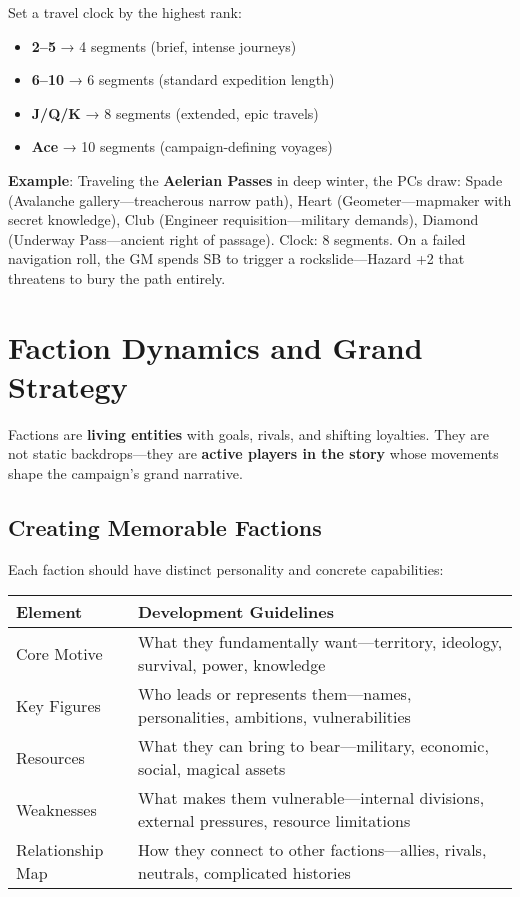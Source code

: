 Set a travel clock by the highest rank:
\begin{itemize}
    \item \textbf{2--5} → 4 segments (brief, intense journeys)
    \item \textbf{6--10} → 6 segments (standard expedition length)
    \item \textbf{J/Q/K} → 8 segments (extended, epic travels)
    \item \textbf{Ace} → 10 segments (campaign-defining voyages)
\end{itemize}

\textbf{Example}: Traveling the \textbf{Aelerian Passes} in deep winter, the PCs draw: Spade (Avalanche gallery—treacherous narrow path), Heart (Geometer—mapmaker with secret knowledge), Club (Engineer requisition—military demands), Diamond (Underway Pass—ancient right of passage). Clock: 8 segments. On a failed navigation roll, the GM spends SB to trigger a rockslide—Hazard +2 that threatens to bury the path entirely.

\section*{Faction Dynamics and Grand Strategy}

Factions are \textbf{living entities} with goals, rivals, and shifting loyalties. They are not static backdrops---they are \textbf{active players in the story} whose movements shape the campaign's grand narrative.

\subsection*{Creating Memorable Factions}

Each faction should have distinct personality and concrete capabilities:

\begin{fatebox}
\begin{tabularx}{\textwidth}{lX}
\toprule
\textbf{Element} & \textbf{Development Guidelines} \\
\midrule
Core Motive & What they fundamentally want—territory, ideology, survival, power, knowledge \\
Key Figures & Who leads or represents them—names, personalities, ambitions, vulnerabilities \\
Resources & What they can bring to bear—military, economic, social, magical assets \\
Weaknesses & What makes them vulnerable—internal divisions, external pressures, resource limitations \\
Relationship Map & How they connect to other factions—allies, rivals, neutrals, complicated histories \\
\bottomrule
\end{tabularx}
\end{fatebox}

